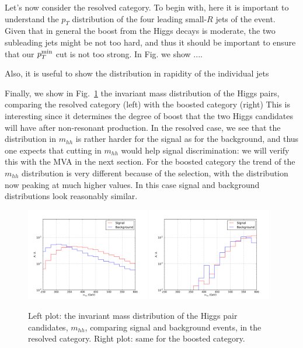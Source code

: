 Let's now consider the resolved category.
%
To begin with, here it is important to understand the $p_T$ distribution
of the four leading small-$R$ jets of the event.
%
Given that in general the boost from the Higgs decays is moderate,
the two subleading jets might be not too hard, and thus it
should be important to ensure that our $p_T^{\rm min}$ cut
is not too strong.
%
In Fig. we show ....

Also, it is useful to show the distribution in rapidity of the
individual jets




Finally, we show in
Fig.~\ref{fig:mhh} the invariant mass distribution of the Higgs pairs,
comparing the resolved category (left) with the boosted category (right)
%
This is interesting since it determines the degree of boost that the two
Higgs candidates will have after non-resonant production.
%
In the resolved case, we see that the distribution
in $m_{hh}$ is rather harder for the signal as for the background,
and thus one expects that cutting in $m_{hh}$ would help signal
discrimination: we will verify this with the MVA in the next section.
%
For the boosted category the trend of the $m_{hh}$ distribution
is very different because of the selection, with the
distribution now peaking at much higher values.
%
In this case signal and background distributions
look reasonably similar.



\begin{figure}[t]
\begin{center}
  \includegraphics[width=0.48\textwidth]{plots/m_HH_res_C1.pdf}
  \includegraphics[width=0.48\textwidth]{plots/m_HH_boost_C1.pdf}
  \caption{\small Left plot: the invariant mass distribution of the Higgs
    pair candidates, $m_{hh}$, comparing signal and background events,
    in the resolved category.
    Right plot: same for the boosted category.
}
\label{fig:mhh}
\end{center}
\end{figure}
